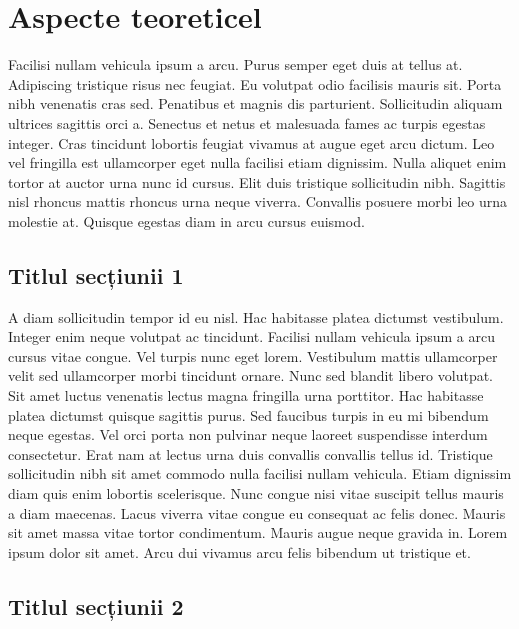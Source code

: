 \chapter{Aspecte teoreticel}
Facilisi nullam vehicula ipsum a arcu. Purus semper eget duis at tellus at. Adipiscing tristique risus nec feugiat. Eu volutpat odio facilisis mauris sit. Porta nibh venenatis cras sed. Penatibus et magnis dis parturient. Sollicitudin aliquam ultrices sagittis orci a. Senectus et netus et malesuada fames ac turpis egestas integer. Cras tincidunt lobortis feugiat vivamus at augue eget arcu dictum. Leo vel fringilla est ullamcorper eget nulla facilisi etiam dignissim. Nulla aliquet enim tortor at auctor urna nunc id cursus. Elit duis tristique sollicitudin nibh. Sagittis nisl rhoncus mattis rhoncus urna neque viverra. Convallis posuere morbi leo urna molestie at. Quisque egestas diam in arcu cursus euismod.

\section{Titlul secțiunii 1}

A diam sollicitudin tempor id eu nisl. Hac habitasse platea dictumst vestibulum. Integer enim neque volutpat ac tincidunt. Facilisi nullam vehicula ipsum a arcu cursus vitae congue. Vel turpis nunc eget lorem. Vestibulum mattis ullamcorper velit sed ullamcorper morbi tincidunt ornare. Nunc sed blandit libero volutpat. Sit amet luctus venenatis lectus magna fringilla urna porttitor. Hac habitasse platea dictumst quisque sagittis purus. Sed faucibus turpis in eu mi bibendum neque egestas. Vel orci porta non pulvinar neque laoreet suspendisse interdum consectetur. Erat nam at lectus urna duis convallis convallis tellus id. Tristique sollicitudin nibh sit amet commodo nulla facilisi nullam vehicula. Etiam dignissim diam quis enim lobortis scelerisque. Nunc congue nisi vitae suscipit tellus mauris a diam maecenas. Lacus viverra vitae congue eu consequat ac felis donec. Mauris sit amet massa vitae tortor condimentum. Mauris augue neque gravida in. Lorem ipsum dolor sit amet. Arcu dui vivamus arcu felis bibendum ut tristique et.

\section{Titlul secțiunii 2}

